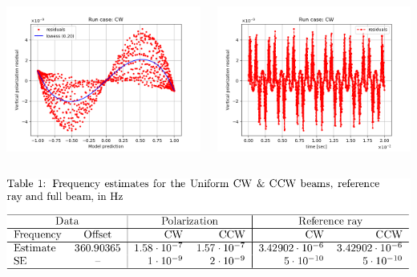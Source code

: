 \documentclass{beamer}
\begin{document}
\begin{frame}
  \begin{columns}
    \begin{column}{.5\textwidth}
      \begin{center}
        \includegraphics[height=.5\paperheight]{img/spin_axis_motion/long/CW_LONG_residual_vs_fit}
      \end{center}
    \end{column}
    \begin{column}{.5\textwidth}
      \begin{center}
        \includegraphics[height=.5\paperheight]{img/spin_axis_motion/long/CW_LONG_residual_vs_time}
      \end{center}
    \end{column}
  \end{columns}
  \begin{center}
    \includegraphics[height=.25\paperheight]{img/spin_axis_motion/presentation/uni_beam_table}
  \end{center}
\end{frame}
\end{document}
